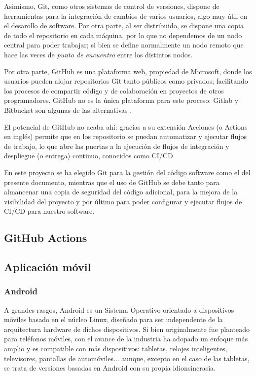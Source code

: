            Asimismo, Git, como otros sistemas de control de versiones, dispone de herramientas para la integración de
            cambios de varios usuarios, algo muy útil en el desarollo de software. Por otra parte, al ser distribuido,
            se dispone una copia de todo el repositorio en cada máquina, por lo que no dependemos de un nodo central
            para poder trabajar; si bien se define normalmente un nodo remoto que hace las veces de \textit{punto de
            encuentro} entre los distintos nodos. 

            Por otra parte, GitHub es una plataforma web, propiedad de Microsoft, donde los usuarios pueden alojar
            repositorios Git tanto públicos como privados; facilitando los procesos de compartir código y de 
            colaboración en proyectos de otros programadores. GitHub no es la única plataforma para este proceso: Gitlab
            y Bitbucket son algunas de las alternativas \cite{noauthor_git_2021}. 

            El potencial de GitHub no acaba ahí: gracias a su extensión Acciones (o Actions en inglés) permite que en
            los repositorio se puedan automatizar y ejecutar flujos de trabajo, lo que abre las puertas a la ejecución
            de flujos de integración y despliegue (o entrega) continuo, conocidos como CI/CD.

            En este proyecto se ha elegido Git para la gestión del código software como el del presente documento,
            mientras que el uso de GitHub se debe tanto para almancenar una copia de seguridad del código adicional, 
            para la mejora de la visibilidad del proyecto y por último para poder configurar y ejecutar flujos de CI/CD
            para nuestro software.

            
        \subsection{GitHub Actions}

    \subsection{Aplicación móvil}

        \subsubsection{Android}

            A grandes rasgos, Android es un Sistema Operativo orientado a dispositivos móviles basado en el núcleo 
            Linux, diseñado para ser independente de la arquitectura hardware de dichos dispositivos. 
            Si bien originalmente fue planteado para teléfonos móviles, con el avance de la industria ha adopado 
            un enfoque más amplio y es compatible con más dispositivos: tabletas, relojes inteligentes, televisores, 
            pantallas de automóviles... aunque, excepto en el caso de las tabletas, se trata de versiones basadas en
            Android con su propia idionsincrasia. 

